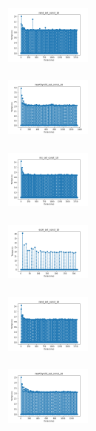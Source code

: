 \begin{figure}[H]
\begin{subfigure}
        \centering
        \includegraphics[width=0.234\textwidth]{img/am10/rand_set_const_10_277451237_time.png}
    \end{subfigure}
    \hfill
    \begin{subfigure}
        \centering
        \includegraphics[width=0.234\textwidth]{img/am10/newthyroid_set_const_10_277451237_time.png}
    \end{subfigure}
    \hfill
    \begin{subfigure}
        \centering
        \includegraphics[width=0.234\textwidth]{img/am10/iris_set_const_10_49258669_time.png}
    \end{subfigure}
    \hfill
    \begin{subfigure}
        \centering
        \includegraphics[width=0.234\textwidth]{img/am10/ecoli_set_const_10_49258669_time.png}
    \end{subfigure}
    \hfill
    \begin{subfigure}
        \centering
        \includegraphics[width=0.234\textwidth]{img/am10/rand_set_const_10_49258669_time.png}
    \end{subfigure}
    \hfill
    \begin{subfigure}
        \centering
        \includegraphics[width=0.234\textwidth]{img/am10/newthyroid_set_const_10_49258669_time.png}

\end{subfigure}
\end{figure}
